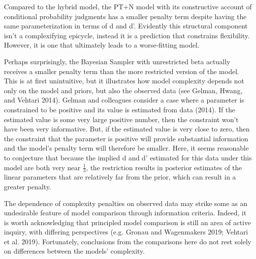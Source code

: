 \documentclass{article}
\begin{document}
Compared to the hybrid model, the PT+N model with its constructive
account of conditional probability judgments has a smaller penalty term
despite having the same parameterization in terms of d and d'. Evidently
this structural component isn't a complexifying epicycle, instead it is
a prediction that constrains flexibility. However, it is one that
ultimately leads to a worse-fitting model.

Perhaps surprisingly, the Bayesian Sampler with unrestricted beta
actually receives a smaller penalty term than the more restricted
version of the model. This is at first unintuitive, but it illustrates
how model complexity depends not only on the model and priors, but also
the observed data (see Gelman, Hwang, and Vehtari 2014). Gelman and
colleagues consider a case where a parameter is constrained to be
positive and its value is estimated from data (2014). If the estimated
value is some very large positive number, then the constraint won't have
been very informative. But, if the estimated value is very close to
zero, then the constraint that the parameter is positive will provide
substantial information and the model's penalty term will therefore be
smaller. Here, it seems reasonable to conjecture that because the
implied d and d' estimated for this data under this model are both very
near \(\frac{1}{3}\), the restriction results in posterior estimates of
the linear parameters that are relatively far from the prior, which can
result in a greater penalty.

The dependence of complexity penalties on observed data may strike some
as an undesirable feature of model comparison through information
criteria. Indeed, it is worth acknowledging that principled model
comparison is still an area of active inquiry, with differing
perspectives (e.g. Gronau and Wagenmakers 2019; Vehtari et al. 2019).
Fortunately, conclusions from the comparisons here do not rest solely on
differences between the models' complexity.
\end{document}
